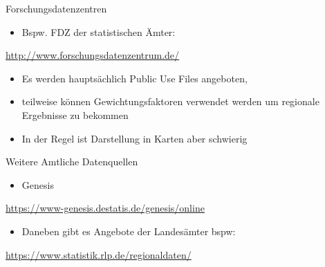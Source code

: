 \documentclass[ignorenonframetext,]{beamer}
\providecommand{\tightlist}{%
  \setlength{\itemsep}{0pt}\setlength{\parskip}{0pt}}
\begin{document}
\begin{frame}{Forschungsdatenzentren}
\protect\hypertarget{forschungsdatenzentren}{}

\begin{itemize}
\tightlist
\item
  Bspw. FDZ der statistischen Ämter:
\end{itemize}

\url{http://www.forschungsdatenzentrum.de/}

\begin{itemize}
\item
  Es werden hauptsächlich Public Use Files angeboten,
\item
  teilweise können Gewichtungsfaktoren verwendet werden um regionale
  Ergebnisse zu bekommen
\item
  In der Regel ist Darstellung in Karten aber schwierig
\end{itemize}

\end{frame}

\begin{frame}{Weitere Amtliche Datenquellen}
\protect\hypertarget{weitere-amtliche-datenquellen}{}

\begin{itemize}
\tightlist
\item
  Genesis
\end{itemize}

\url{https://www-genesis.destatis.de/genesis/online}

\begin{itemize}
\tightlist
\item
  Daneben gibt es Angebote der Landesämter bspw:
\end{itemize}

\url{https://www.statistik.rlp.de/regionaldaten/}

\end{frame}
\end{document}
